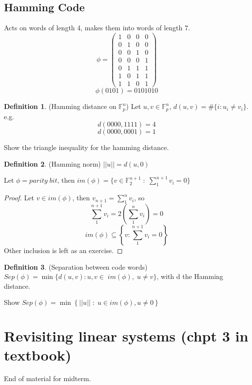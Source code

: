 \documentclass[12pt]{article}
\theoremstyle{definition}
\newtheorem{definition}{Definition}[section]
\theoremstyle{remark}
\begin{document}
\subsection{Hamming Code}
Acts on words of length 4, makes them into words of length 7.
$$\phi = \begin{pmatrix} 
    1&0&0&0 \\ 0&1&0&0 \\0&0&1&0 \\ 0&0&0&1\\ 0&1&1&1 \\ 1&0&1&1 \\ 1&1&0&1 
\end{pmatrix}$$
$$\phi(0101) = 0101010$$
\begin{definition}(Hamming distance on $\mathbb{F}^n_p$)
    Let $u, v \in\mathbb{F}^n_p$, $d(u,v)=\# \{i : u_i \neq v_i\}$. e.g. 
    $$d(0000,1111) = 4$$
    $$d(0000,0001) = 1$$ 
\end{definition}
\begin{example}
    Show the triangle inequality for the hamming distance. 
\end{example}
\begin{definition}(Hamming norm)
    $||u|| = d(u,0)$
    
\end{definition}
\begin{example}
    Let $\phi = parity \; bit$, then $im(\phi) = \{v \in \mathbb{F}^{n+1}_2 \; : \; \sum^{n+1}_1 v_i= 0\}$
    \begin{proof}
        Let $v\in im(\phi)$, then $v_{n+1} = \sum^n_1 v_i$, so 
        $$\sum^{n+1}_1 v_i = 2\left(\sum^n_1 v_i\right) = 0$$
        $$im(\phi) \subseteq \left\{ v : \sum^{n+1}_1 v_i=0\right\}$$
        Other inclusion is left as an exercise. 
    \end{proof}
\end{example}
\begin{definition}(Separation between code words)
    $Sep(\phi) = \min \{ d(u,v) : u,v \in \; im(\phi), \; u\neq v\} $, with d the Hamming distance. 
\end{definition}
\begin{example}
    Show $Sep(\phi) = \min \left\{ ||u|| \; :\; u \in im(\phi), u\neq 0\right\}$
\end{example}
\section{Revisiting linear systems (chpt 3 in textbook)}
End of material for midterm. 
\end{document}
